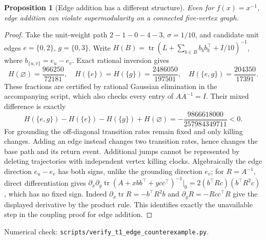 \documentclass[11pt]{article}
\newtheorem{proposition}[theorem]{Proposition}
\DeclareMathOperator{\tr}{tr}
\begin{document}
\begin{proposition}[Edge addition has a different structure]\label{prop:edge}
Even for $f(x)=x^{-1}$, edge addition can violate supermodularity on a
connected five-vertex graph.
\end{proposition}
\begin{proof}
Take the unit-weight path $2-1-0-4-3$, $\sigma=1/10$, and candidate
unit edges $e=\{0,2\}$, $g=\{0,3\}$. Write
$H(B)=\tr(L+\sum_{b\in B}b_b b_b^\top+I/10)^{-1}$, where
$b_{\{u,v\}}=e_u-e_v$. Exact rational inversion gives
\[
 H(\varnothing)=\frac{966250}{72181},\quad
 H(\{e\})=H(\{g\})=\frac{2486050}{197501},\quad
 H(\{e,g\})=\frac{204350}{17391}.
\]
These fractions are certified by rational Gaussian elimination in the
accompanying script, which also checks every entry of $AA^{-1}=I$.
Their mixed difference is exactly
\[
 H(\{e,g\})-H(\{e\})-H(\{g\})+H(\varnothing)
 =-\frac{9866618000}{257984349711}<0.
\]
For grounding the off-diagonal transition rates remain fixed and
only killing changes. Adding an edge instead changes two transition
rates, hence changes the base path and its return event. Additional
jumps cannot be represented by deleting trajectories with independent
vertex killing clocks. Algebraically the edge direction $e_u-e_v$
has both signs, unlike the grounding direction $e_v$; for $R=A^{-1}$,
direct differentiation gives
$\partial_x\partial_y\tr(A+xbb^\top+ycc^\top)^{-1}|_{0}
=2(b^\top Rc)(b^\top R^2c)$, which has no fixed sign.
Indeed $\partial_x\tr R=-b^\top R^2b$ and
$\partial_yR=-Rcc^\top R$ give the displayed derivative by the product
rule. This identifies exactly the unavailable step in the coupling
proof for edge addition.
\end{proof}
\noindent Numerical check: \texttt{scripts/verify\_t1\_edge\_counterexample.py}.
\end{document}
